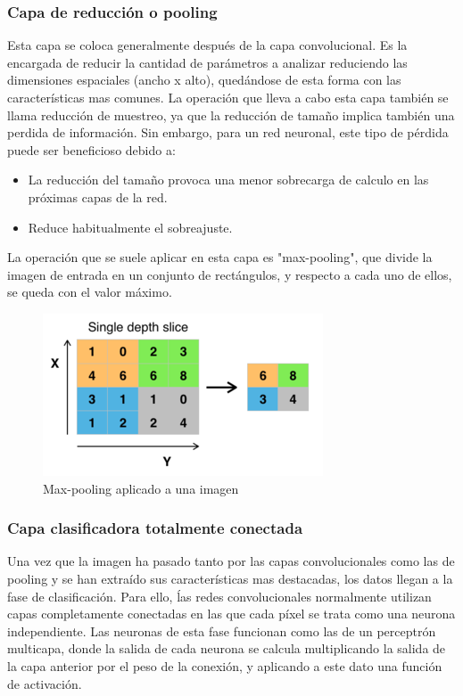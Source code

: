 \subsubsection{Capa de reducción o pooling}
Esta capa se coloca generalmente después de la capa convolucional. Es la encargada de reducir la cantidad de parámetros a analizar reduciendo las dimensiones espaciales (ancho x alto), quedándose de esta forma con las características mas comunes. La operación que lleva a cabo esta capa también se llama reducción de muestreo, ya que la reducción de tamaño implica también una perdida de información. Sin embargo, para un red neuronal, este tipo de pérdida puede ser beneficioso debido a:
\begin{itemize}
\item La reducción del tamaño provoca una menor sobrecarga de calculo en las próximas capas de la red.
\item Reduce habitualmente el sobreajuste.
\end{itemize}
La operación que se suele aplicar en esta capa es "max-pooling", que divide la imagen de entrada en un conjunto de rectángulos, y respecto a cada uno de ellos, se queda con el valor máximo.
\begin{figure}[htp]
\centering
\includegraphics[scale=0.7]{images/max_pooling.png}
\caption{Max-pooling aplicado a una imagen}
\end{figure}
\subsubsection{Capa clasificadora totalmente conectada}
Una vez que la imagen ha pasado tanto por las capas convolucionales como las de pooling y se han extraído sus características mas destacadas, los datos llegan a la fase de clasificación. Para ello, ĺas redes convolucionales normalmente utilizan capas completamente conectadas en las que cada píxel se trata como una neurona independiente. Las neuronas de esta fase funcionan como las de un perceptrón multicapa, donde la salida de cada neurona se calcula multiplicando la salida de la capa anterior por el peso de la conexión, y aplicando a este dato una función de activación.

